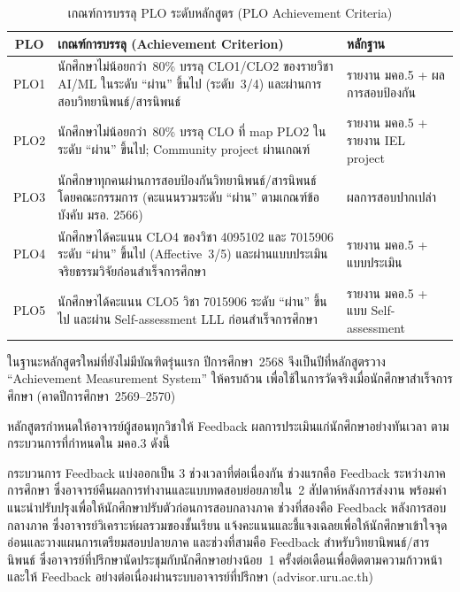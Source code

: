 \begin{table}[H]
  \centering
  \caption{เกณฑ์การบรรลุ PLO ระดับหลักสูตร (PLO Achievement Criteria)}
  \label{tbl:plo_achievement_criteria}
  \begingroup
  \footnotesize
  \setlength{\tabcolsep}{3pt}
  \renewcommand{\arraystretch}{1.2}
  \begin{tabularx}{\linewidth}{|c|>{\raggedright\arraybackslash}X|>{\raggedright\arraybackslash}X|}
    \hline
    \textbf{PLO} & \textbf{เกณฑ์การบรรลุ (Achievement Criterion)} & \textbf{หลักฐาน} \\
    \hline
    PLO1 & นักศึกษาไม่น้อยกว่า~80\% บรรลุ CLO1/CLO2 ของรายวิชา AI/ML ในระดับ ``ผ่าน'' ขึ้นไป (ระดับ~3/4) และผ่านการสอบวิทยานิพนธ์/สารนิพนธ์ & รายงาน มคอ.5 + ผลการสอบป้องกัน \\
    \hline
    PLO2 & นักศึกษาไม่น้อยกว่า~80\% บรรลุ CLO ที่ map PLO2 ในระดับ ``ผ่าน'' ขึ้นไป; Community project ผ่านเกณฑ์ & รายงาน มคอ.5 + รายงาน IEL project \\
    \hline
    PLO3 & นักศึกษาทุกคนผ่านการสอบป้องกันวิทยานิพนธ์/สารนิพนธ์โดยคณะกรรมการ (คะแนนรวมระดับ ``ผ่าน'' ตามเกณฑ์ข้อบังคับ มรอ. 2566) & ผลการสอบปากเปล่า \\
    \hline
    PLO4 & นักศึกษาได้คะแนน CLO4 ของวิชา 4095102 และ 7015906 ระดับ ``ผ่าน'' ขึ้นไป (Affective~3/5) และผ่านแบบประเมินจริยธรรมวิจัยก่อนสำเร็จการศึกษา & รายงาน มคอ.5 + แบบประเมิน \\
    \hline
    PLO5 & นักศึกษาได้คะแนน CLO5 วิชา 7015906 ระดับ ``ผ่าน'' ขึ้นไป และผ่าน Self-assessment LLL ก่อนสำเร็จการศึกษา & รายงาน มคอ.5 + แบบ Self-assessment \\
    \hline
  \end{tabularx}
  \endgroup
\end{table}

ในฐานะหลักสูตรใหม่ที่ยังไม่มีบัณฑิตรุ่นแรก ปีการศึกษา~2568 จึงเป็นปีที่หลักสูตรวาง ``Achievement Measurement System'' ให้ครบถ้วน เพื่อใช้ในการวัดจริงเมื่อนักศึกษาสำเร็จการศึกษา (คาดปีการศึกษา~2569--2570)


หลักสูตรกำหนดให้อาจารย์ผู้สอนทุกวิชาให้ Feedback ผลการประเมินแก่นักศึกษาอย่างทันเวลา ตามกระบวนการที่กำหนดใน มคอ.3 ดังนี้

กระบวนการ Feedback แบ่งออกเป็น 3 ช่วงเวลาที่ต่อเนื่องกัน ช่วงแรกคือ Feedback ระหว่างภาคการศึกษา ซึ่งอาจารย์คืนผลการทำงานและแบบทดสอบย่อยภายใน~2 สัปดาห์หลังการส่งงาน พร้อมคำแนะนำปรับปรุงเพื่อให้นักศึกษาปรับตัวก่อนการสอบกลางภาค ช่วงที่สองคือ Feedback หลังการสอบกลางภาค ซึ่งอาจารย์วิเคราะห์ผลรวมของชั้นเรียน แจ้งคะแนนและชี้แจงเฉลยเพื่อให้นักศึกษาเข้าใจจุดอ่อนและวางแผนการเตรียมสอบปลายภาค และช่วงที่สามคือ Feedback สำหรับวิทยานิพนธ์/สารนิพนธ์ ซึ่งอาจารย์ที่ปรึกษานัดประชุมกับนักศึกษาอย่างน้อย~1 ครั้งต่อเดือนเพื่อติดตามความก้าวหน้าและให้ Feedback อย่างต่อเนื่องผ่านระบบอาจารย์ที่ปรึกษา (advisor.uru.ac.th)


